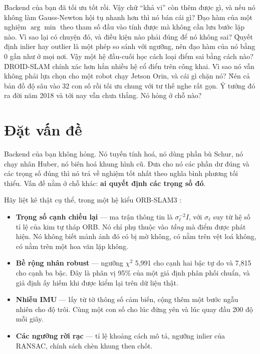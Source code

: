 \documentclass[../../deep_learning.tex]{subfiles}
\begin{document}
\begin{khoigoi}
\h{Backend của bạn đã tối ưu tốt rồi. Vậy chữ ``khả vi'' còn thêm được gì, và nếu nó không làm Gauss-Newton hội tụ nhanh hơn thì nó bán cái gì?}
\h{Đạo hàm của một nghiệm \(\arg\min\) theo tham số đầu vào tính được mà không cần lưu bước lặp nào. Vì sao lại có chuyện đó, và điều kiện nào phải đúng để nó không sai?}
\h{Quyết định inlier hay outlier là một phép so sánh với ngưỡng, nên đạo hàm của nó bằng 0 gần như ở mọi nơi. Vậy một hệ đầu-cuối học cách loại điểm sai bằng cách nào?}
\h{DROID-SLAM chính xác hơn hẳn nhiều hệ cổ điển trên  công khai. Vì sao nó vẫn không phải lựa chọn cho một robot chạy Jetson Orin, và cái gì chặn nó?}
\h{Nén cả bản đồ độ sâu vào 32 con số rồi tối ưu chung với tư thế nghe rất gọn. Ý tưởng đó ra đời năm 2018 và tới nay vẫn chưa thắng. Nó hỏng ở chỗ nào?}
\end{khoigoi}

\section{Đặt vấn đề}
Backend của bạn không hỏng. Nó tuyến tính hoá, nó dùng phần bù Schur, nó chạy nhân Huber, nó biên hoá khung hình cũ. Đưa cho nó các phần dư đúng và các trọng số đúng thì nó trả về nghiệm tốt nhất theo nghĩa bình phương tối thiểu. Vấn đề nằm ở chỗ khác: \textbf{ai quyết định các trọng số đó}.

Hãy liệt kê thật cụ thể, trong một hệ kiểu ORB-SLAM3 \cite{campos2021orbslam3}:

\begin{itemize}
\item \textbf{Trọng số cạnh chiếu lại} --- ma trận thông tin là \(\sigma_\ell^{-2}I\), với \(\sigma_\ell\) suy từ hệ số tỉ lệ của kim tự tháp ORB. Nó chỉ phụ thuộc vào \emph{tầng} mà điểm được phát hiện. Nó không biết mảnh ảnh đó có bị mờ không, có nằm trên vệt loá không, có nằm trên một hoa văn lặp không.
\item \textbf{Bề rộng nhân robust} --- ngưỡng \(\chi^2\) 5,991 cho cạnh hai bậc tự do và 7,815 cho cạnh ba bậc. Đây là phân vị 95\% của một giả định phân phối chuẩn, và giả định ấy hiếm khi được kiểm lại trên dữ liệu thật.
\item \textbf{Nhiễu IMU} --- lấy từ tờ thông số cảm biến, cộng thêm một bước ngẫu nhiên cho độ trôi. Cùng một con số cho lúc đứng yên và lúc quay đầu 200 độ mỗi giây.
\item \textbf{Các ngưỡng rời rạc} --- tỉ lệ khoảng cách mô tả, ngưỡng inlier của RANSAC, chính sách chèn khung then chốt.
\end{itemize}
\end{document}
